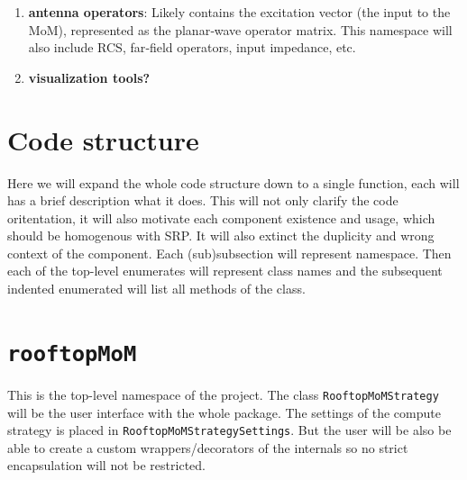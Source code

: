\documentclass[9pt]{article}
\begin{document}
\begin{enumerate}[label=\Roman*.]
\begin{enumerate}[label=\roman*.]
            \item \textbf{Green's‐matrix planner}: Similar to the impedance‐matrix planner; it determines which indices to generate at once.
            \item \textbf{Green's‐matrix assembler}: Assembles the matrix representation of the Green’s operator in a format acceptable for subsequent calculations.
            \item \textbf{conjugate‐gradient solver}: Solves for the currents given an excitation using the conjugate‐gradient method. The preconditioner will be implemented in a separate class.
        \end{enumerate}
        \item \textbf{antenna operators}: Likely contains the excitation vector (the input to the MoM), represented as the planar‐wave operator matrix. This namespace will also include RCS, far‐field operators, input impedance, etc.
        \item \textbf{visualization tools?}
    \end{enumerate}

    \section{Code structure}

    Here we will expand the whole code structure down to a single function, each will has a brief description what it does. This will not only clarify the code oritentation, it will also motivate each component existence and usage, which should be homogenous with SRP. It will also extinct the duplicity and wrong context of the component. Each (sub)subsection will represent namespace. Then each of the top-level enumerates will represent class names and the subsequent indented enumerated will list all methods of the class.

    \section{\texttt{rooftopMoM}}

    This is the top-level namespace of the project. The class \texttt{RooftopMoMStrategy} will be the user interface with the whole package. The settings of the compute strategy is placed in \texttt{RooftopMoMStrategySettings}. But the user will be also be able to create a custom wrappers/decorators of the internals so no strict encapsulation will not be restricted.
\end{document}
